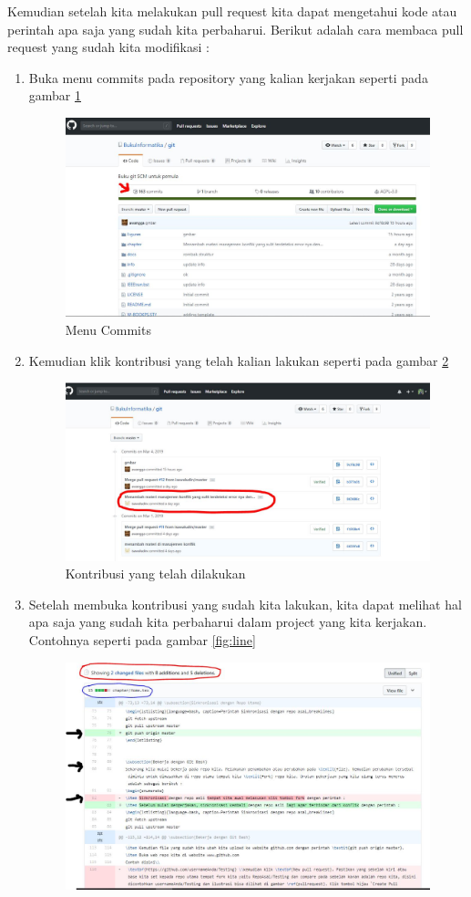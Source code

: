 Kemudian setelah kita melakukan pull request kita dapat mengetahui kode atau perintah apa saja yang sudah kita perbaharui. Berikut adalah cara membaca pull request yang sudah kita modifikasi :
\begin{enumerate}
\item Buka menu commits pada repository yang kalian kerjakan seperti pada gambar \ref{fig:commits}
\subitem
\begin{figure}[!htbp]
\centerline{\includegraphics[width=.75\textwidth]{Figures/membacapr/commits.JPG}}
\caption{Menu Commits}
\label{fig:commits}
\end{figure}
\item Kemudian klik kontribusi yang telah kalian lakukan seperti pada gambar \ref{fig:file} 
\subitem
\begin{figure}[!htbp]
\centerline{\includegraphics[width=.75\textwidth]{Figures/membacapr/file.JPG}}
\caption{Kontribusi yang telah dilakukan}
\label{fig:file}
\end{figure}
\item Setelah membuka kontribusi yang sudah kita lakukan, kita dapat melihat hal apa saja yang sudah kita perbaharui dalam project yang kita kerjakan. Contohnya seperti pada gambar \ref{fig:line} 
\subitem
\begin{figure}[!htbp]
\centerline{\includegraphics[width=.75\textwidth]{Figures/membacapr/line.JPG}}

\end{figure}
\end{enumerate}
